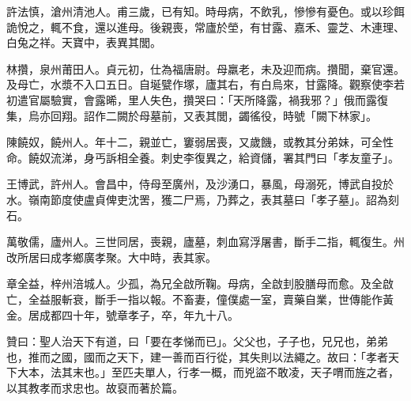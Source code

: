 \begin{pinyinscope}
 許法慎，滄州清池人。甫三歲，已有知。時母病，不飲乳，慘慘有憂色。或以珍餌詭悅之，輒不食，還以進母。後親喪，常廬於塋，有甘露、嘉禾、靈芝、木連理、白兔之祥。天寶中，表異其閭。



 林攢，泉州莆田人。貞元初，仕為福唐尉。母羸老，未及迎而病。攢聞，棄官還。及母亡，水漿不入口五日。自埏甓作塚，廬其右，有白烏來，甘露降。觀察使李若初遣官屬驗實，會露晞，里人失色，攢哭曰：「天所降露，禍我邪？」俄而露復集，烏亦回翔。詔作二闕於母墓前，又表其閭，蠲徭役，時號「闕下林家」。



 陳饒奴，饒州人。年十二，親並亡，窶弱居喪，又歲饑，或教其分弟妹，可全性命。饒奴流涕，身丐訴相全養。刺史李復異之，給資儲，署其門曰「孝友童子」。



 王博武，許州人。會昌中，侍母至廣州，及沙湧口，暴風，母溺死，博武自投於水。嶺南節度使盧貞俾吏沈罟，獲二尸焉，乃葬之，表其墓曰「孝子墓」。詔為刻石。



 萬敬儒，廬州人。三世同居，喪親，廬墓，刺血寫浮屠書，斷手二指，輒復生。州改所居曰成孝鄉廣孝聚。大中時，表其家。



 章全益，梓州涪城人。少孤，為兄全啟所鞠。母病，全啟刲股膳母而愈。及全啟亡，全益服斬衰，斷手一指以報。不畜妻，僮僕處一室，賣藥自業，世傳能作黃金。居成都四十年，號章孝子，卒，年九十八。



 贊曰：聖人治天下有道，曰「要在孝悌而已」。父父也，子子也，兄兄也，弟弟也，推而之國，國而之天下，建一善而百行從，其失則以法繩之。故曰：「孝者天下大本，法其末也。」至匹夫單人，行孝一概，而兇盜不敢凌，天子喟而旌之者，以其教孝而求忠也。故裒而著於篇。



\end{pinyinscope}